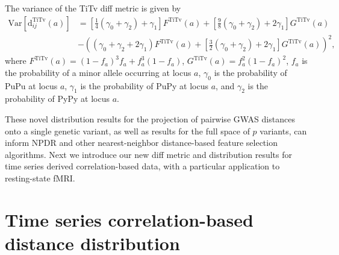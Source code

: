 \documentclass[10pt,letterpaper]{article}
\begin{document}
The variance of the TiTv diff metric is given by
%
\begin{equation}\label{eq:TiTvdiffVar}
\begin{aligned}
\text{Var}\left[\text{d}^\text{TiTv}_{ij}(a)\right] &= \left[\frac{1}{4}(\gamma_0 + \gamma_2) + \gamma_1\right] F^\text{TiTv}(a) + \left[\frac{9}{8}(\gamma_0 + \gamma_2) + 2\gamma_1\right] G^\text{TiTv}(a) \\
&- \left((\gamma_0 + \gamma_2 + 2\gamma_1)F^\text{TiTv}(a) + \left[\frac{3}{2}(\gamma_0 + \gamma_2) + 2\gamma_1\right] G^\text{TiTv}(a)\right)^2,
\end{aligned}
\end{equation}
%
where $F^\text{TiTv}(a) = \left(1 - f_a\right)^3 f_a + f^3_a \left(1 - f_a\right)$, $G^\text{TiTv}(a) = f^2_a \left(1 - f_a\right)^2$, $f_a$ is the probability of a minor allele occurring at locus $a$, $\gamma_0$ is the probability of PuPu at locus $a$, $\gamma_1$ is the probability of PuPy at locus $a$, and $\gamma_2$ is the probability of PyPy at locus $a$.

These novel distribution results for the projection of pairwise GWAS distances onto a single genetic variant, as well as results for the full space of $p$ variants, can inform NPDR and other nearest-neighbor distance-based feature selection algorithms. Next we introduce our new diff metric and distribution results for time series derived correlation-based data, with a particular application to resting-state fMRI.

\section*{Time series correlation-based distance distribution}\label{sec:rs-fMRI_distances}
\end{document}
